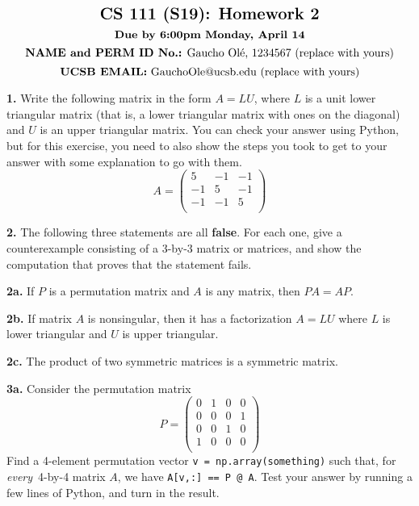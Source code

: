 \documentclass[11pt]{article}
\begin{document}
$$\mbox{\Large \textbf {CS 111 (S19): Homework 2}}$$
$$\mbox{\textbf {Due by 6:00pm Monday, April 14}}$$
$$\mbox{\textbf {NAME and PERM ID No.:} Gaucho Ol\'e, 1234567 (replace with yours)}$$
$$\mbox{\textbf {UCSB EMAIL:} GauchoOle@ucsb.edu (replace with yours)}$$

\par\bigskip
\textbf {1.}
Write the following matrix in the form $A=LU$, 
where $L$ is a unit lower triangular matrix
(that is, a lower triangular matrix with ones on the diagonal) 
and $U$ is an upper triangular matrix. You can check your answer using Python, but for this exercise, you need to also show the steps you took to get to your answer with some explanation to go with them.
$$A =
   \left(
   \begin{array}{ccc}
    5 & -1 & -1 \\ 	
   -1 &  5 & -1 \\ 
   -1 & -1 &  5 \\
   \end{array} \right)
$$

\par\bigskip
\textbf {2.}
The following three statements are all \textbf {false}. For each one, 
give a counterexample consisting of a 3-by-3 matrix or matrices, 
and show the computation that proves that the statement fails.

\par\medskip
\textbf {2a.}
If $P$ is a permutation matrix and $A$ is any matrix, then $PA=AP$.

\par\medskip
\textbf {2b.}
If matrix $A$ is nonsingular, then it has a factorization $A=LU$
where $L$ is lower triangular and $U$ is upper triangular.

\par\medskip
\textbf {2c.}
The product of two symmetric matrices is a symmetric matrix.

\par\bigskip
\textbf {3a.} Consider the permutation matrix 
$$P =
   \left(
   \begin{array}{cccc}
    0 & 1 & 0 & 0 \\ 	
    0 & 0 & 0 & 1 \\ 	
    0 & 0 & 1 & 0 \\ 	
    1 & 0 & 0 & 0 \\ 	
   \end{array} \right)
$$
Find a 4-element permutation vector {\tt v = np.array(something)}
such that, for {\em every}\, 4-by-4 matrix $A$, 
we have {\tt A[v,:] == P @ A}.
Test your answer by running a few lines of Python, 
and turn in the result. 
\end{document}
